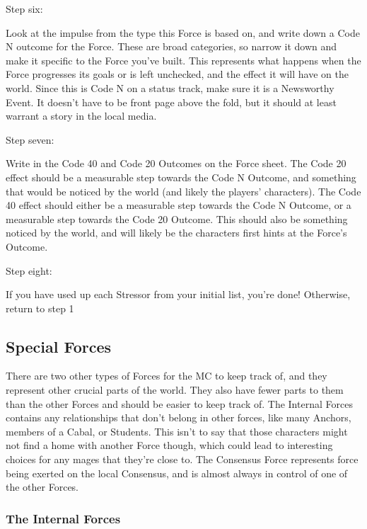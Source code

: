 \documentclass[
]{article}
\begin{document}
Step six:

Look at the impulse from the type this Force is based on, and write down
a Code N outcome for the Force. These are broad categories, so narrow it
down and make it specific to the Force you've built. This represents
what happens when the Force progresses its goals or is left unchecked,
and the effect it will have on the world. Since this is Code N on a
status track, make sure it is a Newsworthy Event. It doesn't have to be
front page above the fold, but it should at least warrant a story in the
local media.

Step seven:

Write in the Code 40 and Code 20 Outcomes on the Force sheet. The Code
20 effect should be a measurable step towards the Code N Outcome, and
something that would be noticed by the world (and likely the players'
characters). The Code 40 effect should either be a measurable step
towards the Code N Outcome, or a measurable step towards the Code 20
Outcome. This should also be something noticed by the world, and will
likely be the characters first hints at the Force's Outcome.

Step eight:

If you have used up each Stressor from your initial list, you're done!
Otherwise, return to step 1

\hypertarget{special-forces}{%
\subsection{Special Forces}\label{special-forces}}

There are two other types of Forces for the MC to keep track of, and
they represent other crucial parts of the world. They also have fewer
parts to them than the other Forces and should be easier to keep track
of. The Internal Forces contains any relationships that don't belong in
other forces, like many Anchors, members of a Cabal, or Students. This
isn't to say that those characters might not find a home with another
Force though, which could lead to interesting choices for any mages that
they're close to. The Consensus Force represents force being exerted on
the local Consensus, and is almost always in control of one of the other
Forces.

\hypertarget{the-internal-forces}{%
\subsubsection{The Internal Forces}\label{the-internal-forces}}
\end{document}
